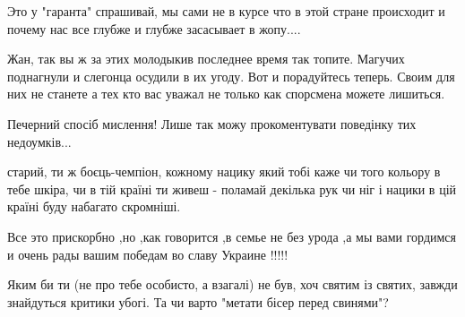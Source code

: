 \begin{itemize}
Это у "гаранта" спрашивай, мы сами не в курсе что в этой стране происходит и
почему нас все глубже и глубже засасывает в жопу....


 

Жан, так вы ж за этих молодыкив последнее время так топите. Магучих поднагнули
и слегонца осудили в их угоду. Вот и порадуйтесь теперь. Своим для них не
станете а тех кто вас уважал не только как спорсмена можете лишиться.

 
Печерний спосіб мислення! Лише так можу прокоментувати поведінку тих недоумків...

 

старий, ти ж боєць-чемпіон, кожному нацику який тобі каже чи того кольору в
тебе шкіра, чи в тій країні ти живеш - поламай декілька рук чи ніг і нацики в
цій країні буду набагато скромніші.


 

Все это прискорбно ,но ,как говорится ,в семье не без урода ,а мы вами гордимся
и очень рады вашим победам во славу Украине !!!!!


 

Яким би ти (не про тебе особисто, а взагалі) не був, хоч святим із святих,
завжди знайдуться критики убогі. Та чи варто "метати бісер перед свинями"?



\end{itemize}
